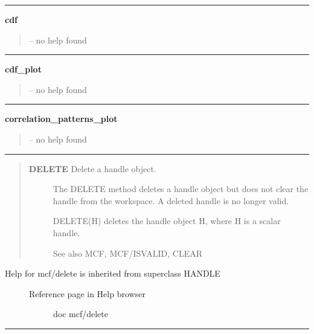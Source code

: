 \documentclass[letterpaper,10pt,english]{sphinxmanual}
\begin{document}
\bigskip\hrule{}\bigskip

\label{classes/utils/@mcf/mcf:cdf}
\textbf{cdf}
\begin{quote}

-- no help found
\end{quote}


\bigskip\hrule{}\bigskip

\label{classes/utils/@mcf/mcf:cdf-plot}
\textbf{cdf\_plot}
\begin{quote}

-- no help found
\end{quote}


\bigskip\hrule{}\bigskip

\label{classes/utils/@mcf/mcf:correlation-patterns-plot}
\textbf{correlation\_patterns\_plot}
\begin{quote}

-- no help found
\end{quote}


\bigskip\hrule{}\bigskip

\label{classes/utils/@mcf/mcf:delete}\begin{quote}
\begin{description}
\item[{\textbf{DELETE}   Delete a handle object.}] \leavevmode
The DELETE method deletes a handle object but does not clear the handle
from the workspace.  A deleted handle is no longer valid.

DELETE(H) deletes the handle object H, where H is a scalar handle.

See also MCF, MCF/ISVALID, CLEAR

\end{description}
\end{quote}
\begin{description}
\item[{Help for mcf/delete is inherited from superclass HANDLE}] \leavevmode\begin{description}
\item[{Reference page in Help browser}] \leavevmode
doc mcf/delete

\end{description}

\end{description}


\bigskip\hrule{}\bigskip
\end{document}
